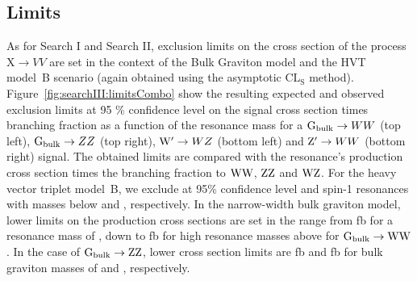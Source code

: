 \subsection{Limits}
As for Search I and Search II, exclusion limits on the cross section of the process $\text{X} \to VV$ are set in the context of the Bulk Graviton model and the HVT model~B scenario (again obtained using the asymptotic $\text{CL}_\text{S}$ method). Figure~\ref{fig:searchIII:limitsCombo} show the resulting expected and observed exclusion limits at 95 \% confidence level on the signal cross section times branching fraction as a function of the resonance mass for a $\mathrm{G}_\mathrm{bulk}\rightarrow WW$ (top left), $\mathrm{G}_\mathrm{bulk}\rightarrow ZZ$ (top right), $\mathrm{W}^\prime\rightarrow WZ$ (bottom left) and $\mathrm{Z}^\prime\rightarrow WW$ (bottom right) signal. The obtained limits are compared with the resonance's production cross section times the branching fraction to $\mathrm{W}\mathrm{W}$, $\mathrm{Z}\mathrm{Z}$ and $\mathrm{W}\mathrm{Z}$. For the heavy vector triplet model~B, we exclude at 95\% confidence level \PWpr and \PZpr spin-1 resonances with masses below \MassExclWPr and \MassExclZPr\TeV, respectively. In the narrow-width bulk graviton model, lower limits on the production cross sections are set in the range from \BulkGWWMassMinXsec\unit{fb} for a resonance mass of \BulkGMassMin\TeV, down to \BulkGWWMassMaxXsec\unit{fb} for high resonance masses above \BulkGMassMax\TeV for $\mathrm{G}_\mathrm{bulk}\rightarrow \mathrm{W}\mathrm{W}$. In the case of $\mathrm{G}_\mathrm{bulk}\rightarrow \mathrm{Z}\mathrm{Z}$, lower cross section limits are \BulkGZZMassMinXsec\unit{fb} and \BulkGZZMassMaxXsec\unit{fb} for bulk graviton masses of \BulkGMassMin and \BulkGMassMax\TeV, respectively.
